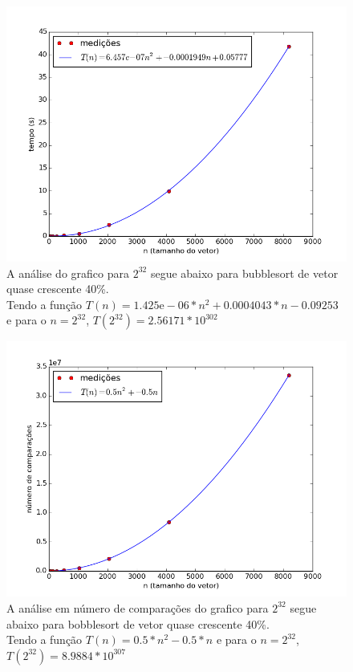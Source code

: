 \documentclass[12pt,a4paper,twoside]{report}
\begin{document}


\begin{figure}[ht]
\centering \includegraphics[scale=0.8]{../bolha/imagens/bolhaQuaseCresc400.png}
\caption{A análise do grafico para $2^{32}$ segue abaixo para bubblesort de vetor quase crescente 40\%.\\
Tendo a função $T(n) = 1.425\mathrm{e}-06*n^2+0.0004043*n-0.09253$ e para o $n =2^{32}$, $T(2^{32}) = 2.56171 * 10^{302}$}
\label{fig:bolhaQuaseCresc400}
\end{figure}

\begin{figure}[ht]
\centering \includegraphics[scale=0.8]{../bolha/imagens/bolhaQuaseCresc401.png}
\caption{A análise em número de comparações do grafico para $2^{32}$ segue abaixo para bobblesort de vetor quase crescente 40\%.\\
Tendo a função $T(n) = 0.5*n^2 - 0.5*n$ e para o $n =2^{32}$, $T(2^{32}) = 8.9884 * 10^{307}$}
\label{fig:bolhaQuaseCresc401}
\end{figure}
\end{document}
